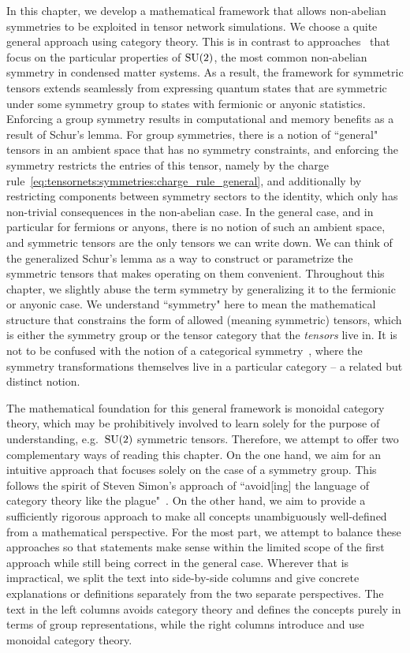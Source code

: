 In this chapter, we develop a mathematical framework that allows non-abelian symmetries to be exploited in tensor network simulations.
%
We choose a quite general approach using category theory.
%
This is in contrast to approaches~\cite{mcculloch2002a, schmoll2018, scheb2023} that focus on the particular properties of $\mathrm{SU}(2)$, the most common non-abelian symmetry in condensed matter systems.
%
As a result, the framework for symmetric tensors extends seamlessly from expressing quantum states that are symmetric under some symmetry group to states with fermionic or anyonic statistics.
%
Enforcing a group symmetry results in computational and memory benefits as a result of Schur's lemma.
%
For group symmetries, there is a notion of ``general" tensors in an ambient space that has no symmetry constraints, and enforcing the symmetry restricts the entries of this tensor, namely by the charge rule~\eqref{eq:tensornets:symmetries:charge_rule_general}, and additionally by restricting components between symmetry sectors to the identity, which only has non-trivial consequences in the non-abelian case.
%
In the general case, and in particular for fermions or anyons, there is no notion of such an ambient space, and symmetric tensors are the only tensors we can write down.
%
We can think of the generalized Schur's lemma as a way to construct or parametrize the symmetric tensors that makes operating on them convenient.
%
Throughout this chapter, we slightly abuse the term symmetry by generalizing it to the fermionic or anyonic case.
%
We understand ``symmetry" here to mean the mathematical structure that constrains the form of allowed (meaning symmetric) tensors, which is either the symmetry group or the tensor category that the \emph{tensors} live in.
%
It is not to be confused with the notion of a categorical symmetry~\cite{ji2020a}, where the symmetry transformations themselves live in a particular category -- a related but distinct notion.



The mathematical foundation for this general framework is monoidal category theory, which may be prohibitively involved to learn solely for the purpose of understanding, e.g.~$\mathrm{SU}(2)$ symmetric tensors.
%
Therefore, we attempt to offer two complementary ways of reading this chapter.
%
On the one hand, we aim for an intuitive approach that focuses solely on the case of a symmetry group.
%
This follows the spirit of Steven Simon's approach of ``avoid[ing] the language of category theory like the plague"~\cite{simon2023}.
%
On the other hand, we aim to provide a sufficiently rigorous approach to make all concepts unambiguously well-defined from a mathematical perspective.
%
For the most part, we attempt to balance these approaches so that statements make sense within the limited scope of the first approach while still being correct in the general case.
%
Wherever that is impractical, we split the text into side-by-side columns and give concrete explanations or definitions separately from the two separate perspectives.
%
The text in the left columns avoids category theory and defines the concepts purely in terms of group representations, while the right columns introduce and use monoidal category theory.



